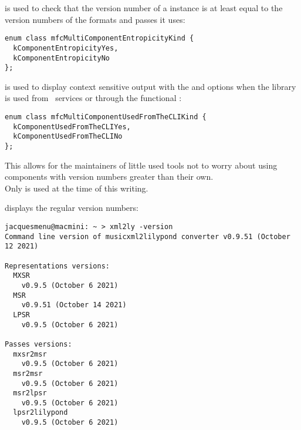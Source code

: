  is used to check that the version number of a  instance is at least equal to the version numbers of the formats and passes it uses:
\begin{lstlisting}[language=CPlusPlus]
enum class mfcMultiComponentEntropicityKind {
  kComponentEntropicityYes,
  kComponentEntropicityNo
};
\end{lstlisting}

 is used to display context sensitive output with the  and  options when the library is used from \CLI\ services or through the functional \API:
\begin{lstlisting}[language=CPlusPlus]
enum class mfcMultiComponentUsedFromTheCLIKind {
  kComponentUsedFromTheCLIYes,
  kComponentUsedFromTheCLINo
};
\end{lstlisting}

This allows for the maintainers of little used tools not to worry about using components with version numbers greater than their own. \\
Only  is used at the time of this writing.

 displays the regular version numbers:
\begin{lstlisting}[language=Terminal]
jacquesmenu@macmini: ~ > xml2ly -version
Command line version of musicxml2lilypond converter v0.9.51 (October 12 2021)

Representations versions:
  MXSR
    v0.9.5 (October 6 2021)
  MSR
    v0.9.51 (October 14 2021)
  LPSR
    v0.9.5 (October 6 2021)

Passes versions:
  mxsr2msr
    v0.9.5 (October 6 2021)
  msr2msr
    v0.9.5 (October 6 2021)
  msr2lpsr
    v0.9.5 (October 6 2021)
  lpsr2lilypond
    v0.9.5 (October 6 2021)
\end{lstlisting}

